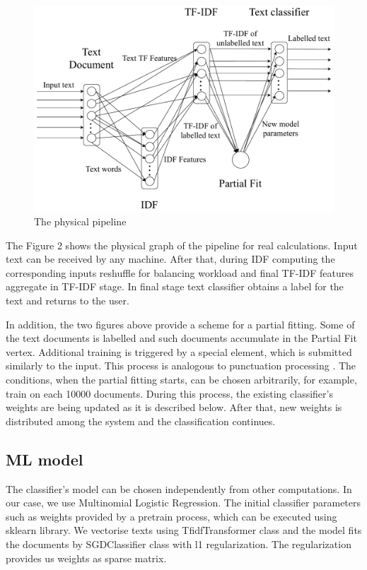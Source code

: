 \begin{figure}[htbp]
  \centering
  \includegraphics[scale=0.375]{pics/physical-graph}
  \caption{The physical pipeline}
  \label {physical graph}
\end{figure}

The Figure 2 shows the physical graph of the pipeline for real calculations. Input text can be received by any machine. After that, during IDF computing the corresponding inputs reshuffle for balancing workload and final TF-IDF features aggregate in TF-IDF stage. In final stage text classifier obtains a label for the text and returns to the user.

In addition, the two figures above provide a scheme for a partial fitting. Some of the text documents is labelled and such documents accumulate in the Partial Fit vertex. Additional training is triggered by a special element, which is submitted similarly to the input. This process is analogous to punctuation processing \cite{tucker2003exploiting}. The conditions, when the partial fitting starts, can be chosen arbitrarily, for example, train on each 10000 documents. During this process, the existing classifier's weights are being updated as it is described below. After that, new weights is distributed among the system and the classification continues. 

\subsection{ML model}

The classifier's model can be chosen independently from other computations. In our case, we use Multinomial Logistic Regression. The initial classifier parameters such as weights provided by a pretrain process, which can be executed using sklearn library. We vectorise texts using TfidfTransformer class and the model fits the documents by SGDClassifier class with l1 regularization. The regularization provides us weights as sparse matrix.

